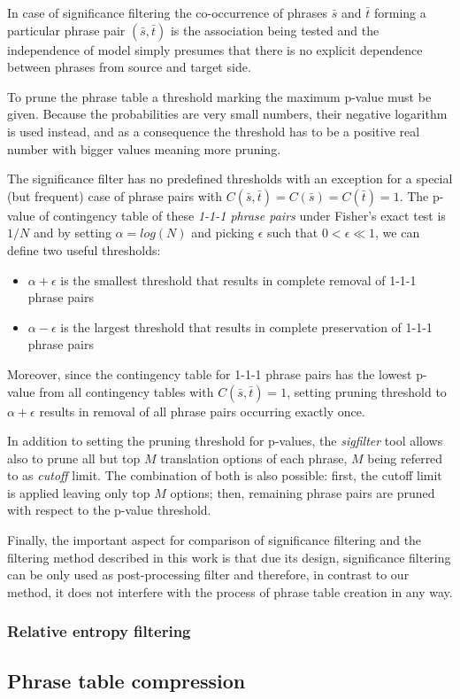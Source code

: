In case of significance filtering the co-occurrence of phrases $\bar{s}$ and $\bar{t}$
forming a particular phrase pair $(\bar{s},\bar{t})$ is the association being tested
and the independence of model simply presumes that there is no explicit dependence
between phrases from source and target side.

To prune the phrase table a threshold marking the maximum p-value must be given.
Because the probabilities are very small numbers, their negative logarithm is used
instead, and as a consequence the threshold has to be a positive real number with
bigger values meaning more pruning.

The significance filter has no predefined thresholds with an exception for a special
(but frequent) case of phrase pairs with $C(\bar{s},\bar{t}) = C(\bar{s}) = C(\bar{t}) = 1$.
The p-value of contingency table of these \emph{1-1-1 phrase pairs} under Fisher's
exact test is $1/N$ and by setting $\alpha = log(N)$ and picking $\epsilon$ such that
$0 < \epsilon \ll 1$, we can define two useful thresholds:
\begin{itemize}
  \item $\alpha + \epsilon$ is the smallest threshold that results in complete removal
    of 1-1-1 phrase pairs
  \item $\alpha - \epsilon$ is the largest threshold that results in complete preservation
    of 1-1-1 phrase pairs
\end{itemize}

Moreover, since the contingency table for 1-1-1 phrase pairs has the lowest p-value
from all contingency tables with $C(\bar{s},\bar{t}) = 1$, setting pruning threshold
to $\alpha + \epsilon$ results in removal of all phrase pairs occurring exactly once.

In addition to setting the pruning threshold for p-values, the \emph{sigfilter} tool
allows also to prune all but top $M$ translation options of each phrase, $M$ being
referred to as \emph{cutoff} limit.
The combination of both is also possible: first, the cutoff limit is applied leaving
only top $M$ options; then, remaining phrase pairs are pruned with respect to the
p-value threshold.

Finally, the important aspect for comparison of significance filtering and the
filtering method described in this work is that due its design, significance
filtering can be only used as post-processing filter and therefore, in contrast to
our method, it does not interfere with the process of phrase table creation in any way.

\subsubsection*{Relative entropy filtering}

\subsection{Phrase table compression}
